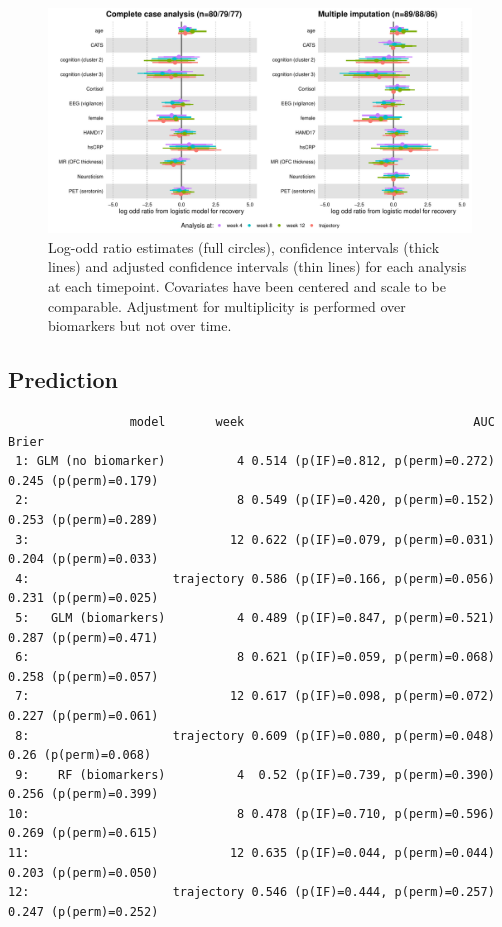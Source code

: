 \documentclass[12pt]{article}
\begin{document}
\begin{figure}[!h]
\centering
\includegraphics[trim={0 0 0 0},width=\textwidth]{./../figures/gg-forestplot-OR-traj.pdf}
\caption{Log-odd ratio estimates (full circles), confidence intervals (thick lines) and adjusted confidence intervals (thin lines) for each analysis at each timepoint. Covariates have been centered and scale to be comparable. Adjustment for multiplicity is performed over biomarkers but not over time.}
\end{figure}

\clearpage

\subsection{Prediction}
\label{sec:orge451c34}

\begin{verbatim}
                 model       week                                AUC                 Brier
 1: GLM (no biomarker)          4 0.514 (p(IF)=0.812, p(perm)=0.272) 0.245 (p(perm)=0.179)
 2:                             8 0.549 (p(IF)=0.420, p(perm)=0.152) 0.253 (p(perm)=0.289)
 3:                            12 0.622 (p(IF)=0.079, p(perm)=0.031) 0.204 (p(perm)=0.033)
 4:                    trajectory 0.586 (p(IF)=0.166, p(perm)=0.056) 0.231 (p(perm)=0.025)
 5:   GLM (biomarkers)          4 0.489 (p(IF)=0.847, p(perm)=0.521) 0.287 (p(perm)=0.471)
 6:                             8 0.621 (p(IF)=0.059, p(perm)=0.068) 0.258 (p(perm)=0.057)
 7:                            12 0.617 (p(IF)=0.098, p(perm)=0.072) 0.227 (p(perm)=0.061)
 8:                    trajectory 0.609 (p(IF)=0.080, p(perm)=0.048)  0.26 (p(perm)=0.068)
 9:    RF (biomarkers)          4  0.52 (p(IF)=0.739, p(perm)=0.390) 0.256 (p(perm)=0.399)
10:                             8 0.478 (p(IF)=0.710, p(perm)=0.596) 0.269 (p(perm)=0.615)
11:                            12 0.635 (p(IF)=0.044, p(perm)=0.044) 0.203 (p(perm)=0.050)
12:                    trajectory 0.546 (p(IF)=0.444, p(perm)=0.257) 0.247 (p(perm)=0.252)
\end{verbatim}
\end{document}
